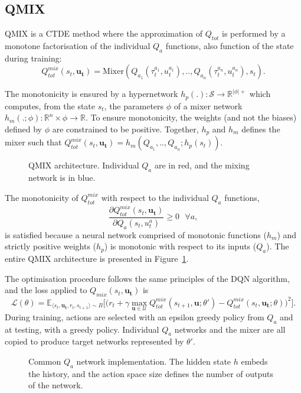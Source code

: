 \subsection{QMIX}
QMIX \citep{Rashid2018} is a CTDE method where the approximation of $Q_{tot}$ is performed by a monotone factorisation of the individual $Q_a$ functions, also function of the state during training:
\begin{equation}
     Q_{tot}^{mix}(s_t, \mathbf{u_t})=\text{Mixer} \left(Q_{a_1}(\tau^{a_1}_t, u_t^{a_1}) ,..,Q_{a_n}(\tau^{a_n}_t, u_t^{a_n}), s_t\right).
     \label{eq:ch3_qmixappendix}
\end{equation}

The monotonicity is ensured by a hypernetwork \citep{Ha2016HyperNetworks} $h_p(.): \mathcal{S} \rightarrow \mathbb{R}^{|\phi|+}$ which computes, from the state $s_t$, the parameters $\phi$ of a mixer network $h_m(.;\phi):\mathbb{R}^n \times \phi \rightarrow \mathbb{R}$.
To ensure monotonicity, the weights (and not the biases) defined by $\phi$ are constrained to be positive.
Together, $h_p$ and $h_m$ defines the mixer such that $ Q_{tot}^{mix}(s_t, \mathbf{u_t}) = h_m\left(Q_{a_1},..,Q_{a_n}; h_p(s_t)\right)$.

\begin{figure}
\centering

\caption{QMIX architecture. Individual $Q_a$ are in red, and the mixing network is in blue.}
\label{fig:qmix}
\end{figure}

The monotonicity of $Q_{tot}^{mix}$ with respect to the individual $Q_a$ functions, 
\begin{equation}
    \frac{\partial Q_{tot}^{mix}(s_t, \mathbf{u_t})}{\partial Q_{a}(s_t, u_t^{a})} \geq 0 \text{ } \forall a
    \label{eq:ch3_monotonicity},
\end{equation}
is satisfied because a neural network comprised of monotonic functions ($h_m$) and strictly positive weights ($h_p$) is monotonic with respect to its inputs ($Q_a$). 
The entire QMIX architecture is presented in Figure~\ref{fig:qmix}.

The optimisation procedure follows the same principles of the DQN algorithm, and the loss applied to $Q_{mix}(s_t, \mathbf{u_t})$ is 
\begin{equation}
    \mathcal{L}(\theta) = \mathbb{E}_{\langle s_{t},\mathbf{u_{t}},r_{t},s_{t+1} \rangle \sim B}
    \bigg[  
    \big(r_{t} + \gamma \max_{\mathbf{u} \in \mathcal{U}} Q_{tot}^{mix}(s_{t+1}, \mathbf{u}; \theta')
    - Q_{tot}^{mix}(s_{t}, \mathbf{u_{t}}; \theta)\big)^{2}
    \bigg].
    \label{eq:QMIX_loss}
\end{equation}
During training, actions are selected with an epsilon greedy policy from $Q_a$ and at testing, with a greedy policy.
Individual $Q_a$ networks and the mixer are all copied to produce target networks represented by $\theta'$.
\begin{figure}
    \centering

\caption{Common $Q_a$ network implementation. The hidden state $h$ embeds the history, and the action space size defines the number of outputs of the network.}
\label{fig:ch3_indivQ}
\end{figure}

